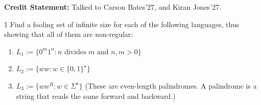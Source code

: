 \documentclass[12pt]{article}
\begin{document}


\textbf{Credit Statement:} Talked to Carson Bates'27, and Kiran Jones'27.

\begin{problem}{1}
    Find a fooling set of infinite size for each of the following languages, thus showing that all of
    them are non-regular:
    \begin{enumerate}
        \item $L_1 := \{0^m1^n : n \text{ divides } m \text{ and }n, m > 0\}$
        \item $L_2 := \{ww: w \in \{0,1\}^\star\}$
        \item $L_3 := \{ww^R: w \in \Sigma^\star\}$ (These are even-length palindromes. A palindrome is a string that reads the same forward and backward.)
    \end{enumerate}
\end{problem}
\end{document}
